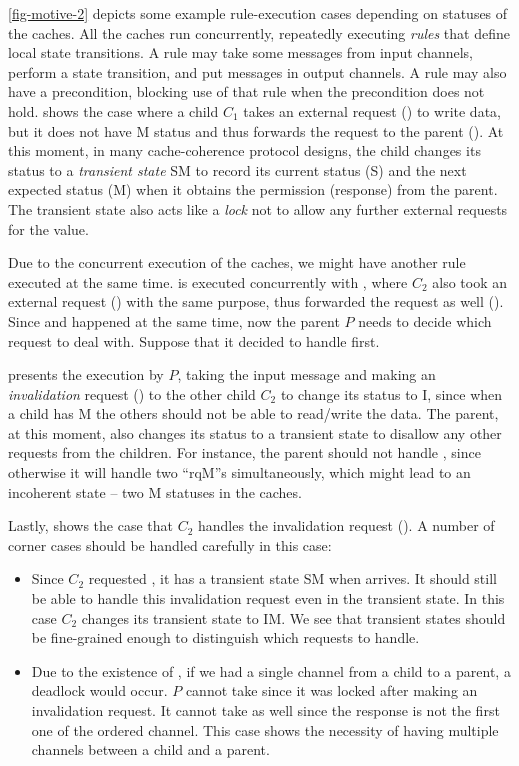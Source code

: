 \documentclass[sigplan,10pt,review,anonymous,screen]{acmart}\settopmatter{printfolios=true,printccs=false,printacmref=false}
\begin{document}
\autoref{fig-motive-2} depicts some example rule-execution cases depending on statuses of the caches.
All the caches run concurrently, repeatedly executing \emph{rules} that define local state transitions.
A rule may take some messages from input channels, perform a state transition, and put messages in output channels.
A rule may also have a precondition, blocking use of that rule when the precondition does not hold.
 shows the case where a child $C_1$ takes an external request () to write data, but it does not have M status and thus forwards the request to the parent ().
At this moment, in many cache-coherence protocol designs, the child changes its status to a \emph{transient state} SM to record its current status (S) and the next expected status (M) when it obtains the permission (response) from the parent.
The transient state also acts like a \emph{lock} not to allow any further external requests for the value.

Due to the concurrent execution of the caches, we might have another rule executed at the same time.
 is executed concurrently with , where $C_2$ also took an external request () with the same purpose, thus forwarded the request as well ().
Since  and  happened at the same time, now the parent $P$ needs to decide which request to deal with.
Suppose that it decided to handle  first.

 presents the execution by $P$, taking the input message  and making an \emph{invalidation} request () to the other child $C_2$ to change its status to I, since when a child has M the others should not be able to read/write the data.
The parent, at this moment, also changes its status to a transient state to disallow any other requests from the children.
For instance, the parent should not handle , since otherwise it will handle two {\sf\small ``rqM''}s simultaneously, which might lead to an incoherent state -- two M statuses in the caches.

Lastly,  shows the case that $C_2$ handles the invalidation request ().
A number of corner cases should be handled carefully in this case:
\begin{itemize}[leftmargin=*]
\item Since $C_2$ requested , it has a transient state SM when  arrives. It should still be able to handle this invalidation request even in the transient state. In this case $C_2$ changes its transient state to IM. We see that transient states should be fine-grained enough to distinguish which requests to handle.
\item Due to the existence of , if we had a single channel from a child to a parent, a deadlock would occur. $P$ cannot take  since it was locked after making an invalidation request. It cannot take  as well since the response is not the first one of the ordered channel. This case shows the necessity of having multiple channels between a child and a parent.
\end{itemize}
\end{document}

